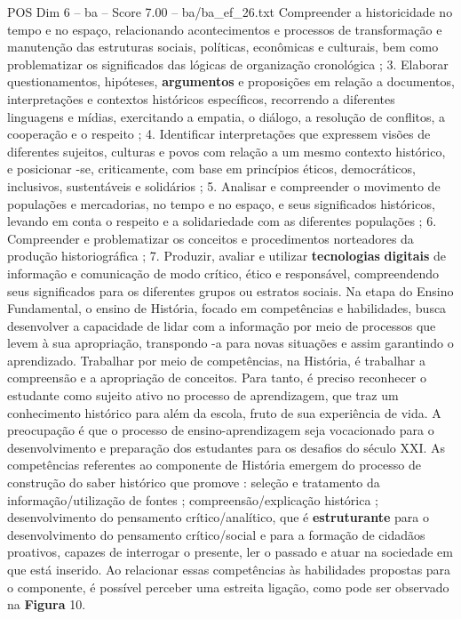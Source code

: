 \begin{textsample}{POS Dim 6 – ba – Score 7.00 – ba/ba\_ef\_26.txt}
Compreender a historicidade no tempo e no espaço, relacionando acontecimentos e processos de transformação e manutenção das estruturas sociais, políticas, econômicas e culturais, bem como problematizar os significados das lógicas de organização cronológica ; 3.
Elaborar questionamentos, hipóteses, \textbf{argumentos} e proposições em relação a documentos, interpretações e contextos históricos específicos, recorrendo a diferentes linguagens e mídias, exercitando a empatia, o diálogo, a resolução de conflitos, a cooperação e o respeito ; 4.
Identificar interpretações que expressem visões de diferentes sujeitos, culturas e povos com relação a um mesmo contexto histórico, e posicionar -se, criticamente, com base em princípios éticos, democráticos, inclusivos, sustentáveis e solidários ; 5.
Analisar e compreender o movimento de populações e mercadorias, no tempo e no espaço, e seus significados históricos, levando em conta o respeito e a solidariedade com as diferentes populações ; 6.
Compreender e problematizar os conceitos e procedimentos norteadores da produção historiográfica ; 7.
Produzir, avaliar e utilizar \textbf{tecnologias} \textbf{digitais} de informação e comunicação de modo crítico, ético e responsável, compreendendo seus significados para os diferentes grupos ou estratos sociais.
Na etapa do Ensino Fundamental, o ensino de História, focado em competências e habilidades, busca desenvolver a capacidade de lidar com a informação por meio de processos que levem à sua apropriação, transpondo -a para novas situações e assim garantindo o aprendizado.
Trabalhar por meio de competências, na História, é trabalhar a compreensão e a apropriação de conceitos.
Para tanto, é preciso reconhecer o estudante como sujeito ativo no processo de aprendizagem, que traz um conhecimento histórico para além da escola, fruto de sua experiência de vida.
A preocupação é que o processo de ensino-aprendizagem seja vocacionado para o desenvolvimento e preparação dos estudantes para os desafios do século XXI.
As competências referentes ao componente de História emergem do processo de construção do saber histórico que promove : seleção e tratamento da informação/utilização de fontes ; compreensão/explicação histórica ; desenvolvimento do pensamento crítico/analítico, que é \textbf{estruturante} para o desenvolvimento do pensamento crítico/social e para a formação de cidadãos proativos, capazes de interrogar o presente, ler o passado e atuar na sociedade em que está inserido.
Ao relacionar essas competências às habilidades propostas para o componente, é possível perceber uma estreita ligação, como pode ser observado na \textbf{Figura} 10.

\end{textsample}
